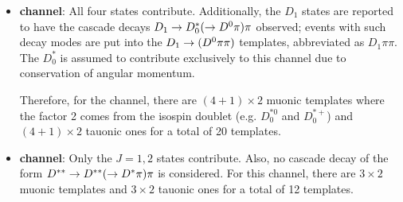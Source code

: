 \begin{itemize}
    \item \textbf{\Dz channel}:
        All four states contribute.
        Additionally, the $D_1$ states are reported to have the cascade decays
        $D_1 \rightarrow D_0^* (\rightarrow {\ensuremath{{D}^0}} \pi) \pi$ observed;
        events with such decay modes are put into the
        $D_1 \rightarrow ({{D}^0} \pi\pi)$ templates,
        abbreviated as $D_1 \pi\pi$.
        The $D_0^*$ is assumed to contribute exclusively to this channel due
        to conservation of angular momentum.

        Therefore, for the \Dz channel,
        there are $(4+1) \times 2$ muonic templates where the factor 2 comes
        from the isospin doublet (e.g. $D_0^{*0}$ and $D_0^{*+}$)
        and $(4+1) \times 2$ tauonic ones for a total of 20 \Dstst templates.

    \item \textbf{\Dstar channel}:
        Only the $J = 1,2$ states contribute.
        Also, no cascade decay of the form
        $D^{**} \rightarrow D^{**} (\rightarrow {\ensuremath{{D}^*}} \pi) \pi$ is considered.
        For this channel,
        there are $3 \times 2$ muonic templates
        and $3 \times 2$ tauonic ones for a total of 12 \Dstst templates.
\end{itemize}

